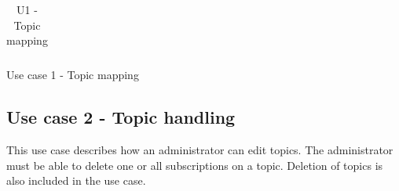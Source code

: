 \begin{table}[ht!]
\begin{minipage}{.6\textwidth}
{\begin{tabular}{|l|p{5cm}|}
\end{tabular}
}
\caption{Use case 1 - Topic mapping}
\label{uc1}
\end{minipage}
\hfill
\begin{minipage}{.4\textwidth}
\centering
\begin{center}
    \caption{U1 - Topic mapping}
    \label{fig:u1}
\end{center}
\end{minipage}
\end{table}

\clearpage

\subsection{Use case 2 - Topic handling}

This use case describes how an administrator can edit topics. The administrator must be able to delete one or all subscriptions on a topic. Deletion of topics is also included in the use case.

